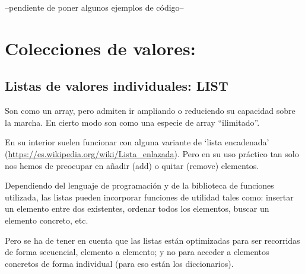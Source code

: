 \documentclass[spanish,12pt,a4paper,final,oneside]{book}
\begin{document}
\vspace{1cm}
--pendiente de poner algunos ejemplos de código--


\section{Colecciones de valores:}

\subsection{Listas de valores individuales: LIST}
Son como un array, pero admiten ir ampliando o reduciendo su capacidad sobre la marcha. En cierto modo son como una especie de array ``ilimitado''.

En su interior suelen funcionar con alguna variante de `lista encadenada' (\url{https://es.wikipedia.org/wiki/Lista_enlazada}). Pero en su uso práctico tan solo nos hemos de preocupar en añadir (add) o quitar (remove) elementos.

Dependiendo del lenguaje de programación y de la biblioteca de funciones utilizada, las listas pueden incorporar funciones de utilidad tales como: insertar un elemento entre dos existentes, ordenar todos los elementos, buscar un elemento concreto, etc.

Pero se ha de tener en cuenta que las listas están optimizadas para ser recorridas de forma secuencial, elemento a elemento; y no para acceder a elementos concretos de forma individual (para eso están los diccionarios).
\end{document}
